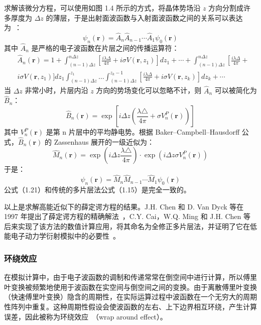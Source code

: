 求解该微分方程，可以使用如图 1.4 所示的方式，将晶体势场沿 $z$ 方向分割成许多厚度为 $\Delta z$ 的薄层，于是出射面波函数与入射面波函数之间的关系可以表达为~\cite{Chen1996}：
\begin{equation}
\psi_n (\boldsymbol{r}) = \hat{A}_n \hat{A}_{n-1} \cdots \hat{A}_1 \psi_0(\boldsymbol{r})
\end{equation}
其中 $\hat{A}_n$ 是严格的电子波函数在片层之间的传播运算符：
\begin{equation}\begin{aligned}
&\hat{A}_{n}(\boldsymbol{r})=1+\int_{(n-1) \Delta z}^{n \Delta z}\left[\frac{i \lambda \Delta}{4 \pi}+i \sigma V(\boldsymbol{r}, z_1)\right] d z_1+\cdots+\int_{(n-1) \Delta z}^{n \Delta z}\left[\frac{i \lambda \Delta}{4 \pi}+\right.\\
&i \sigma V\left(\boldsymbol{r}, z_{1}\right)\Bigg] d z_{1} \int_{(n-1) \Delta z}^{z_{1}} \ldots \int_{(n-1) \Delta z}^{z_{k}-1}\left[\frac{i \lambda \Delta}{4 \pi}+i \sigma V\left(\boldsymbol{r}, z_{k}\right)\right] d z_{k}+\cdots 
\end{aligned}\end{equation}
当 $\Delta z$ 非常小时，片层内沿 $z$ 方向的势场变化可以忽略不计，则 $\hat{A}_n$ 可以被简化为 $\hat{B}_n$：
\begin{equation}
\hat{B}_n (\boldsymbol{r}) = \exp\left[i\Delta z \left( \frac{\lambda \triangle}{4\pi} + \sigma V_n^P (\boldsymbol{r}) \right)\right]
\end{equation}
其中 $V_n^P (\boldsymbol{r})$ 是第 n 片层中的平均静电势。根据 Baker–Campbell–Hausdorff 公式，$\hat{B}_n (\boldsymbol{r})$ 的 Zassenhaus 展开的一级近似为：
\begin{equation}
\hat{M}_n (\boldsymbol{r}) = \exp \left(i\Delta z \frac{\lambda \triangle}{4\pi}\right) \cdot \exp \left(i \Delta z \sigma V_n^P(\boldsymbol{r})\right)
\end{equation}
于是：
\begin{equation}
\psi_n(\boldsymbol{r}) = \hat{M}_n \hat{M}_{n-1} \cdots \hat{M}_1 \psi_0(\boldsymbol{r})
\end{equation}
公式（1.21）和传统的多片层法公式（1.15）是完全一致的。

以上是求解高能近似下的薛定谔方程的结果。J.H. Chen 和 D. Van Dyck 等在 1997 年提出了薛定谔方程的精确解法~\cite{Chen1997}，C.Y. Cai，W.Q. Ming 和 J.H. Chen 等后来实现了该方法的数值计算应用，将其命名为全修正多片层法，并证明了它在低能电子动力学衍射模拟中的必要性~\cite{Cai2009,Ming2013,MWQ2018}。

\subsubsection{环绕效应}
在模拟计算中，由于电子波函数的调制和传递常常在倒空间中进行计算，所以傅里叶变换被频繁地使用于波函数在实空间与倒空间之间的变换。由于离散傅里叶变换（快速傅里叶变换）隐含的周期性，在实际运算过程中波函数在一个无穷大的周期性阵列中重复。这种周期性假设会使波函数的左右、上下边界相互环绕，产生计算误差，因此被称为环绕效应~\cite{Kirkland2010}（wrap around effect）。


